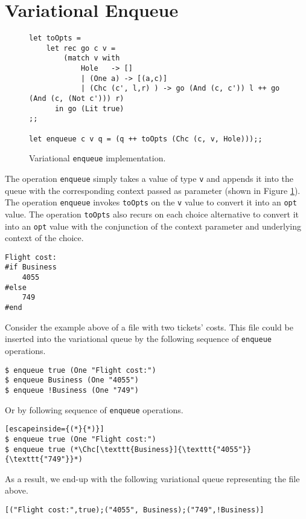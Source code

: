 \section{Variational Enqueue}
\label{sec:queue_enqueu}

\begin{figure}
\begin{lstlisting}
let toOpts = 
    let rec go c v = 
        (match v with 
            Hole   -> []
            | (One a) -> [(a,c)]
            | (Chc (c', l,r) ) -> go (And (c, c')) l ++ go (And (c, (Not c'))) r)
      in go (Lit true)
;;
      
let enqueue c v q = (q ++ toOpts (Chc (c, v, Hole)));;

\end{lstlisting}
  \caption{Variational \texttt{enqueue} implementation.}
  \label{fig:enqueue}
\end{figure}

The operation \texttt{enqueue} simply takes a value of type \texttt{v} and appends it into the queue with the corresponding context passed as parameter (shown in Figure \ref{fig:enqueue}). The operation \texttt{enqueue} invokes \texttt{toOpts} on the \texttt{v} value to convert it into an \texttt{opt} value. The operation \texttt{toOpts} also recurs on each choice alternative to convert it into an \texttt{opt} value with the conjunction of the context parameter and underlying context of the choice. 

\begin{lstlisting}
Flight cost: 
#if Business
    4055
#else
    749
#end
\end{lstlisting}
%
Consider the example above of a file with two tickets' costs. This file could be inserted into the variational queue by the following sequence of \texttt{enqueue} operations. 
%
\begin{lstlisting}
$ enqueue true (One "Flight cost:")
$ enqueue Business (One "4055")
$ enqueue !Business (One "749")
\end{lstlisting}
%
Or by following sequence of \texttt{enqueue} operations.  
\begin{lstlisting}[escapeinside={(*}{*)}]
$ enqueue true (One "Flight cost:")
$ enqueue true (*\Chc[\texttt{Business}]{\texttt{"4055"}}{\texttt{"749"}}*)
\end{lstlisting}
%
As a result, we end-up with the following variational queue representing the file above. 
%
\begin{lstlisting}[backgroundcolor = \color{lightgray}]
[("Flight cost:",true);("4055", Business);("749",!Business)]
\end{lstlisting}


